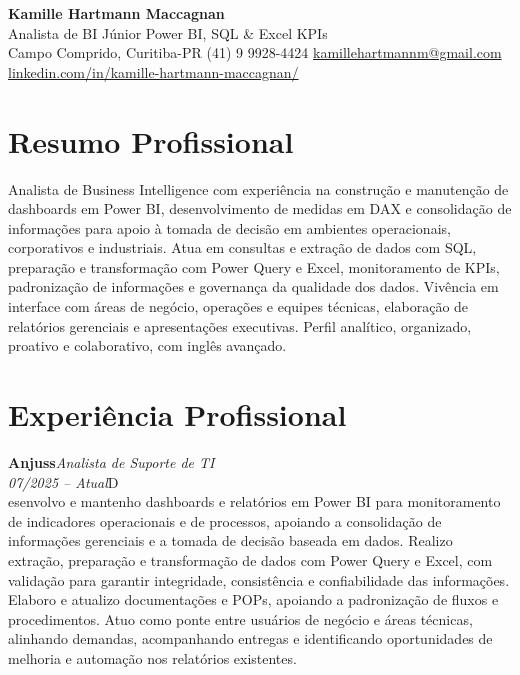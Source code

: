 \documentclass[11pt,a4paper]{article}
\newcommand{\cvrole}[4]{%
  \vspace{4pt}%
  {\bfseries\color{accentcolor}#1}\hfill{\itshape #2}\\[-2pt]%
  {\itshape #3}\hfill #4\\[6pt]%
}
\begin{document}
\begin{center}
  {\fontsize{20}{24}\selectfont\bfseries Kamille Hartmann Maccagnan}\\[8pt]
  {\large Analista de BI Júnior \textbar{} Power BI, SQL \& Excel \textbar{} KPIs}\\[10pt]
  Campo Comprido, Curitiba-PR \enspace\textbullet\enspace (41) 9 9928-4424 \enspace\textbullet\enspace
  \href{mailto:kamillehartmannm@gmail.com}{kamillehartmannm@gmail.com}\\[3pt]
  \href{https://linkedin.com/in/kamille-hartmann-maccagnan/}{linkedin.com/in/kamille-hartmann-maccagnan/}
\end{center}

\vspace{6pt}

\section{Resumo Profissional}

Analista de Business Intelligence com experiência na construção e manutenção de dashboards em Power BI, desenvolvimento de medidas em DAX e consolidação de informações para apoio à tomada de decisão em ambientes operacionais, corporativos e industriais. Atua em consultas e extração de dados com SQL, preparação e transformação com Power Query e Excel, monitoramento de KPIs, padronização de informações e governança da qualidade dos dados. Vivência em interface com áreas de negócio, operações e equipes técnicas, elaboração de relatórios gerenciais e apresentações executivas. Perfil analítico, organizado, proativo e colaborativo, com inglês avançado.

\section{Experiência Profissional}

\cvrole{Anjuss}{Analista de Suporte de TI}{07/2025 -- Atual}

Desenvolvo e mantenho dashboards e relatórios em Power BI para monitoramento de indicadores operacionais e de processos, apoiando a consolidação de informações gerenciais e a tomada de decisão baseada em dados. Realizo extração, preparação e transformação de dados com Power Query e Excel, com validação para garantir integridade, consistência e confiabilidade das informações. Elaboro e atualizo documentações e POPs, apoiando a padronização de fluxos e procedimentos. Atuo como ponte entre usuários de negócio e áreas técnicas, alinhando demandas, acompanhando entregas e identificando oportunidades de melhoria e automação nos relatórios existentes.
\end{document}
